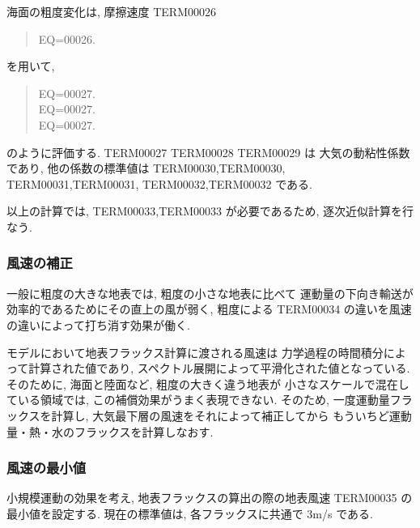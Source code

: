 海面の粗度変化は, 摩擦速度 TERM00026
\begin{quote}
EQ=00026.
\end{quote}
を用いて,
\begin{quote}
EQ=00027.\\
EQ=00027.\\
EQ=00027.
\end{quote}
のように評価する. TERM00027 TERM00028 TERM00029 は
大気の動粘性係数であり, 
他の係数の標準値は
TERM00030,TERM00030,
TERM00031,TERM00031,
TERM00032,TERM00032 である.

以上の計算では, TERM00033,TERM00033 が必要であるため,
逐次近似計算を行なう.

\subsubsection{風速の補正}

一般に粗度の大きな地表では, 粗度の小さな地表に比べて
運動量の下向き輸送が効率的であるためにその直上の風が弱く,
粗度による TERM00034 の違いを風速の違いによって打ち消す効果が働く.

モデルにおいて地表フラックス計算に渡される風速は
力学過程の時間積分によって計算された値であり,
スペクトル展開によって平滑化された値となっている.
そのために, 海面と陸面など, 粗度の大きく違う地表が
小さなスケールで混在している領域では, 
この補償効果がうまく表現できない.
そのため, 一度運動量フラックスを計算し,
大気最下層の風速をそれによって補正してから
もういちど運動量・熱・水のフラックスを計算しなおす.

\subsubsection{風速の最小値}

小規模運動の効果を考え,
地表フラックスの算出の際の地表風速
TERM00035 の最小値を設定する.
現在の標準値は, 各フラックスに共通で
3m/s である.


